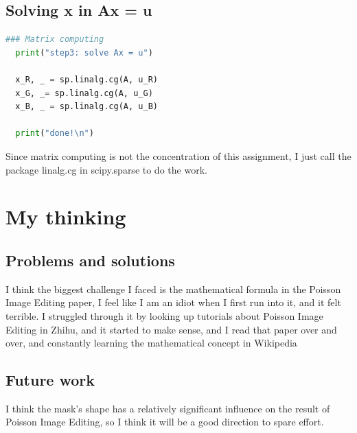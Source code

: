 \documentclass[10pt, a4paper]{article}%
\begin{document}
 \subsection{Solving x in Ax = u}
 \begin{lstlisting}[language=python]
  ### Matrix computing
  print("step3: solve Ax = u")

  x_R, _ = sp.linalg.cg(A, u_R)
  x_G, _= sp.linalg.cg(A, u_G)
  x_B, _ = sp.linalg.cg(A, u_B)

  print("done!\n")
 \end{lstlisting}
 Since matrix computing is not the concentration of this assignment, I just call the package linalg.cg in scipy.sparse to do the work.
 \newpage
 \section{My thinking}
 \subsection{Problems and solutions}
 I think the biggest challenge I faced is the mathematical formula in the Poisson Image Editing paper, I feel like I am an idiot when I first run into it, and it felt terrible. I struggled through it by looking up tutorials about Poisson Image Editing in Zhihu, and it started to make sense, and I read that paper over and over, and constantly learning the mathematical concept in Wikipedia
 \subsection{Future work}
I think the mask's shape has a relatively significant influence on the result of Poisson Image Editing, so I think it will be a good direction to spare effort.
 
\end{document}
